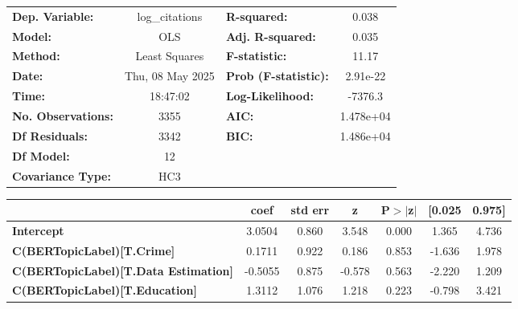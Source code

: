 \begin{center}
\begin{tabular}{lclc}
\toprule
\textbf{Dep. Variable:}                        &  log\_citations  & \textbf{  R-squared:         } &     0.038   \\
\textbf{Model:}                                &       OLS        & \textbf{  Adj. R-squared:    } &     0.035   \\
\textbf{Method:}                               &  Least Squares   & \textbf{  F-statistic:       } &     11.17   \\
\textbf{Date:}                                 & Thu, 08 May 2025 & \textbf{  Prob (F-statistic):} &  2.91e-22   \\
\textbf{Time:}                                 &     18:47:02     & \textbf{  Log-Likelihood:    } &   -7376.3   \\
\textbf{No. Observations:}                     &        3355      & \textbf{  AIC:               } & 1.478e+04   \\
\textbf{Df Residuals:}                         &        3342      & \textbf{  BIC:               } & 1.486e+04   \\
\textbf{Df Model:}                             &          12      & \textbf{                     } &             \\
\textbf{Covariance Type:}                      &       HC3        & \textbf{                     } &             \\
\bottomrule
\end{tabular}
\begin{tabular}{lcccccc}
                                               & \textbf{coef} & \textbf{std err} & \textbf{z} & \textbf{P$> |$z$|$} & \textbf{[0.025} & \textbf{0.975]}  \\
\midrule
\textbf{Intercept}                             &       3.0504  &        0.860     &     3.548  &         0.000        &        1.365    &        4.736     \\
\textbf{C(BERTopicLabel)[T.Crime]}             &       0.1711  &        0.922     &     0.186  &         0.853        &       -1.636    &        1.978     \\
\textbf{C(BERTopicLabel)[T.Data Estimation]}   &      -0.5055  &        0.875     &    -0.578  &         0.563        &       -2.220    &        1.209     \\
\textbf{C(BERTopicLabel)[T.Education]}         &       1.3112  &        1.076     &     1.218  &         0.223        &       -0.798    &        3.421     \\

\end{tabular}
\end{center}
